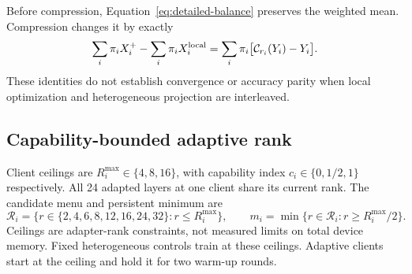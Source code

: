 \documentclass[11pt]{article}
\begin{document}
Before compression, Equation~\eqref{eq:detailed-balance} preserves the weighted mean. Compression changes it by exactly
\begin{equation}
 \sum_i\pi_iX_i^+-\sum_i\pi_iX_i^{\rm local}
 =\sum_i\pi_i\bigl[\mathcal C_{r_i}(Y_i)-Y_i\bigr].
\end{equation}
These identities do not establish convergence or accuracy parity when local optimization and heterogeneous projection are interleaved.

\subsection{Capability-bounded adaptive rank}
Client ceilings are $R_i^{\max}\in\{4,8,16\}$, with capability index $c_i\in\{0,1/2,1\}$ respectively. All 24 adapted layers at one client share its current rank. The candidate menu and persistent minimum are
\begin{equation}
 \mathcal R_i=\{r\in\{2,4,6,8,12,16,24,32\}:r\le R_i^{\max}\},\qquad
 m_i=\min\{r\in\mathcal R_i:r\ge R_i^{\max}/2\}.
\end{equation}
Ceilings are adapter-rank constraints, not measured limits on total device memory. Fixed heterogeneous controls train at these ceilings. Adaptive clients start at the ceiling and hold it for two warm-up rounds.
\end{document}
